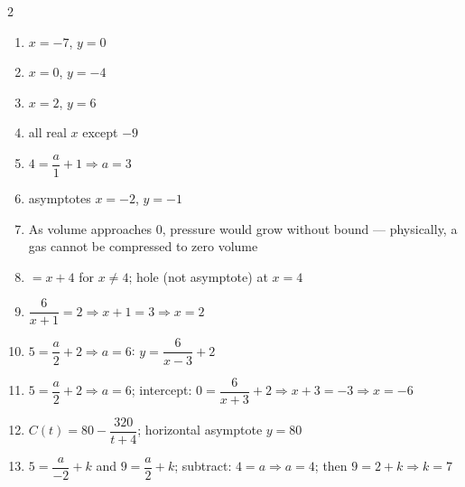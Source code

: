 \documentclass[11pt]{article}
\begin{document}
\begin{keybox}
\begin{multicols}{2}
\small
\begin{enumerate}[leftmargin=*,itemsep=3pt]
  \item $x=-7$, $y=0$
  \item $x=0$, $y=-4$
  \item $x=2$, $y=6$
  \item all real $x$ except $-9$
  \item $4=\dfrac{a}{1}+1\Rightarrow a=3$
  \item asymptotes $x=-2$, $y=-1$
  \item As volume approaches 0, pressure would grow without bound --- physically, a gas cannot be compressed to zero volume
  \item $=x+4$ for $x\neq4$; hole (not asymptote) at $x=4$
  \item $\dfrac{6}{x+1}=2\Rightarrow x+1=3\Rightarrow x=2$
  \item $5=\dfrac a2+2\Rightarrow a=6$: $y=\dfrac6{x-3}+2$
  \item $5=\dfrac{a}{2}+2\Rightarrow a=6$; intercept: $0=\dfrac{6}{x+3}+2\Rightarrow x+3=-3\Rightarrow x=-6$
  \item $C(t)=80-\dfrac{320}{t+4}$; horizontal asymptote $y=80$
  \item $5=\dfrac{a}{-2}+k$ and $9=\dfrac a2+k$; subtract: $4=a\Rightarrow a=4$; then $9=2+k\Rightarrow k=7$
\end{enumerate}
\end{multicols}
\end{keybox}
\end{document}
